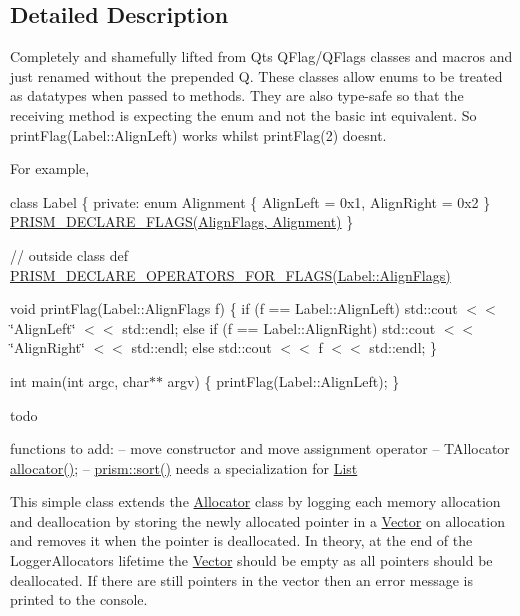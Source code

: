 \subsection{Detailed Description}
Completely and shamefully lifted from Qt\textquotesingle{}s Q\+Flag/\+Q\+Flags classes and macros and just renamed without the prepended \textquotesingle{}Q\textquotesingle{}. These classes allow enums to be treated as datatypes when passed to methods. They are also type-\/safe so that the receiving method is expecting the enum and not the basic int equivalent. So print\+Flag(\+Label\+::\+Align\+Left) works whilst print\+Flag(2) doesn\textquotesingle{}t.

For example,

class Label \{ private\+: enum Alignment \{ Align\+Left = 0x1, Align\+Right = 0x2 \} \hyperlink{_flags_8h_aa5aa2c9827ab949836e20999b9a068ec}{P\+R\+I\+S\+M\+\_\+\+D\+E\+C\+L\+A\+R\+E\+\_\+\+F\+L\+A\+G\+S(\+Align\+Flags, Alignment)} \}

// outside class def \hyperlink{_flags_8h_ae8aabb683a18b872a4449769b82e8e15}{P\+R\+I\+S\+M\+\_\+\+D\+E\+C\+L\+A\+R\+E\+\_\+\+O\+P\+E\+R\+A\+T\+O\+R\+S\+\_\+\+F\+O\+R\+\_\+\+F\+L\+A\+G\+S(\+Label\+::\+Align\+Flags)}

void print\+Flag(\+Label\+::\+Align\+Flags f) \{ if (f == Label\+::\+Align\+Left) std\+::cout $<$$<$ \char`\"{}\+Align\+Left\char`\"{} $<$$<$ std\+::endl; else if (f == Label\+::\+Align\+Right) std\+::cout $<$$<$ \char`\"{}\+Align\+Right\char`\"{} $<$$<$ std\+::endl; else std\+::cout $<$$<$ f $<$$<$ std\+::endl; \}

int main(int argc, char$\ast$$\ast$ argv) \{ print\+Flag(\+Label\+::\+Align\+Left); \}

todo

functions to add\+: -- move constructor and move assignment operator -- T\+Allocator \hyperlink{namespaceprism_af48d4e417d7dc90cd7979795347e1718}{allocator()}; -- \hyperlink{namespaceprism_addfe9ea0146b59b2b16adee4cd2220b9}{prism\+::sort()} needs a specialization for \hyperlink{classprism_1_1_list}{List}

This simple class extends the \hyperlink{classprism_1_1_allocator}{Allocator} class by logging each memory allocation and deallocation by storing the newly allocated pointer in a \hyperlink{classprism_1_1_vector}{Vector} on allocation and removes it when the pointer is deallocated. In theory, at the end of the Logger\+Allocator\textquotesingle{}s lifetime the \hyperlink{classprism_1_1_vector}{Vector} should be empty as all pointers should be deallocated. If there are still pointers in the vector then an error message is printed to the console.

